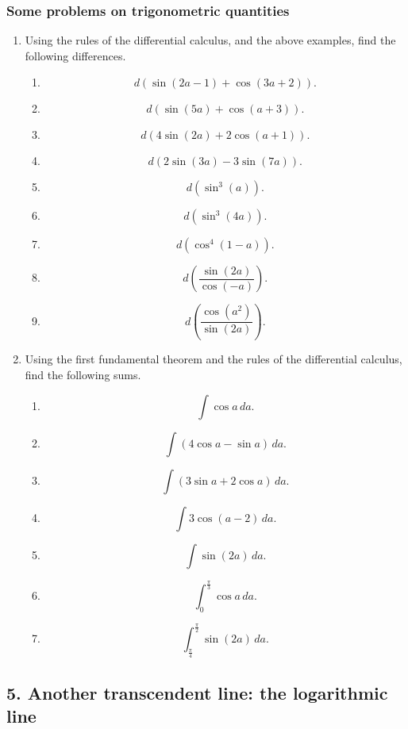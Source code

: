\documentclass[polutonikogreek,english,twoside,openright]{article}
\begin{document}
\subsubsection*{Some problems on trigonometric quantities}

\label{pset6}
\begin{enumerate}
\item Using the rules of the differential calculus, and the above examples, find the following differences.
\begin{enumerate}
\item $$d(\sin(2a-1) + \cos(3a +2)).$$
\item $$d(\sin(5a) + \cos(a+3)).$$
\item $$d(4\sin(2a) + 2\cos(a+1)).$$
\item $$d(2\sin(3a) - 3\sin(7a)).$$
\item $$d(\sin^3(a)).$$
\item $$d(\sin^3(4a)).$$
\item $$d(\cos^4(1-a)).$$
\item $$d\left(\frac{\sin(2a)}{\cos(-a)}\right).$$
\item $$d\left(\frac{\cos(a^2)}{\sin(2a)}\right).$$
\end{enumerate}

\item Using the first fundamental theorem and the rules of the differential calculus, find the following sums.  
\begin{enumerate}
\item $$\int\! \cos a \,da.$$
\item $$\int\! (4\cos a - \sin a)\,da.$$
\item $$\int\! (3\sin a + 2\cos a)\,da.$$
\item $$\int\! 3\cos(a -2)\,da.$$
\item $$\int\! \sin (2a) \,da.$$
\item $$\int_0^\frac{\pi}{3}\!\cos a\,da.$$
\item $$\int_\frac{\pi}{4}^\frac{\pi}{2} \sin(2a)\,da.$$
\end{enumerate}

\end{enumerate}

\subsection*{5. Another transcendent line: the logarithmic line}
\end{document}

